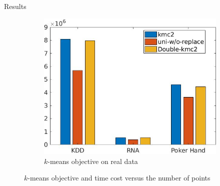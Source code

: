 \documentclass{beamer}
\begin{document}
\begin{frame}{Results}
{\begin{minipage}{1.0\linewidth}
\begin{figure}[H]
\begin{subfigure}{0.493\columnwidth}
					\includegraphics[width=\linewidth]{real-sum-squared-distances.jpg}
					\caption{\small{$k$-means objective on real data}}    
					\label{}
				\end{subfigure}
				\caption{$k$-means objective and time cost versus the number of points}
				\label{fig:running time & sum of distances}
			\end{figure}
		\end{minipage}
%			
	}
	
\end{frame}
\end{document}
